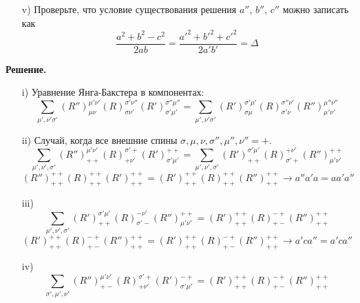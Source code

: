 \documentclass[12pt]{article}
\theoremstyle{definition}
\begin{document}
\begin{enumerate}
\begin{itemize}
        \item[v)] Проверьте, что условие существования решения $a''$, $b''$, $c''$ можно записать как
        \begin{equation}
            \frac{a^2+b^2-c^2}{2ab}=\frac{a'^2+b'^2+c'^2}{2a'b'}=\Delta
        \end{equation}
    \end{itemize}
    \textbf{Решение.}
    \begin{itemize}
        \item[i)] Уравнение Янга-Бакстера в компонентах:
        \begin{equation}
            \boxed{\sum\limits_{\mu',\nu'\sigma'}(R'')^{\mu'\nu'}_{\mu\nu}(R)^{\sigma'\nu''}_{\sigma\nu'}(R')^{\sigma''\mu''}_{\sigma'\mu'}=\sum\limits_{\mu',\nu'\sigma'}(R')^{\sigma'\mu'}_{\sigma\mu}(R)^{\sigma''\nu'}_{\sigma'\nu}(R'')^{\mu''\nu''}_{\mu'\nu'}}
        \end{equation}
        \item[ii)] Случай, когда все внешние спины $\sigma,\mu,\nu,\sigma'',\mu'',\nu''=+$.
        \begin{equation}
            \sum\limits_{\mu',\nu',\sigma'}(R'')^{\mu'\nu'}_{++}(R)^{\sigma'+}_{+\nu'}(R')^{++}_{\sigma'\mu'}=\sum\limits_{\mu',\nu',\sigma'}(R')^{\sigma'\mu'}_{++}(R)^{+\nu'}_{\sigma'+}(R'')^{++}_{\mu'\nu'}
        \end{equation}
        \begin{equation}
            (R'')^{++}_{++}(R)^{++}_{++}(R')^{++}_{++}=(R')^{++}_{++}(R)^{++}_{++}(R'')^{++}_{++}\rightarrow \boxed{a''a'a=aa'a''}
        \end{equation}
        \item[iii)]
        \begin{equation}
            \sum\limits_{\mu',\nu',\sigma'}(R')^{\sigma'\mu'}_{++}(R)^{-\nu'}_{\sigma'-}(R'')^{++}_{\mu'\nu'}=(R')^{++}_{++}(R)^{-+}_{+-}(R'')^{++}_{++}
        \end{equation}
        \begin{equation}
            (R')^{++}_{++}(R)^{-+}_{+-}(R'')^{++}_{++}=(R')^{++}_{++}(R)^{-+}_{+-}(R'')^{++}_{++}\rightarrow\boxed{a'ca''=a'ca''}
        \end{equation}
        \item[iv)]
        \begin{equation}
            \sum\limits_{\sigma',\mu',\nu'}(R'')^{\mu'\nu'}_{+-}(R)^{\sigma'+}_{+\nu'}(R')^{-+}_{\sigma'\mu'}=(R')^{++}_{++}(R)^{-+}_{+-}(R'')^{++}_{++}
        \end{equation}

\end{itemize}
\end{enumerate}
\end{document}
